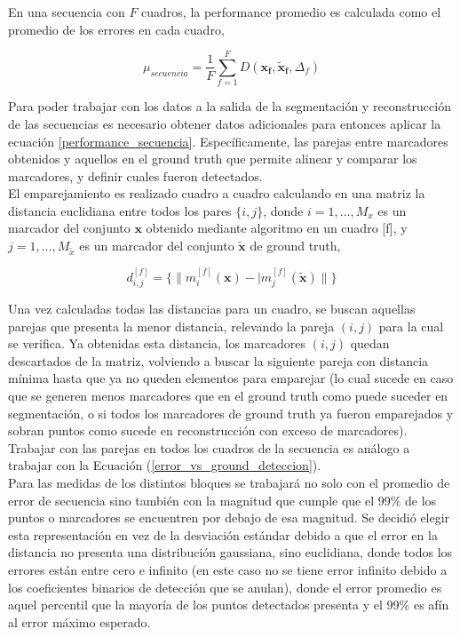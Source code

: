 En una secuencia con $F$ cuadros, la performance promedio es calculada como el promedio de los errores en cada cuadro,

\begin{equation} \label{performance_secuencia}
\mu_{secuencia} = \frac{1}{F}\sum_{f=1}^{F} D(\boldsymbol{x_{f}},\boldsymbol{\tilde{x}_{f}},\Delta_{f})
\end{equation}

Para poder trabajar con los datos a la salida de la segmentación y reconstrucción de las secuencias es necesario obtener datos adicionales para entonces aplicar la ecuación \eqref{performance_secuencia}. Específicamente, las parejas entre marcadores obtenidos y aquellos en el ground truth que permite alinear y comparar los marcadores, y definir cuales fueron detectados.
\\ 

El emparejamiento es realizado cuadro a cuadro calculando en una matriz la distancia euclidiana entre todos los pares $\{i,j\}$, donde $i=1,\ldots,M_{x}$ es un marcador del conjunto $\boldsymbol{x}$ obtenido mediante algoritmo en un cuadro [f], y $j=1,\ldots,M_{\tilde{x}}$ es un marcador del conjunto $\boldsymbol{\tilde{x}}$ de ground truth,

\begin{equation} \label{distancia_algoritmo_ground}
d_{i,j}^{[f]} = \{\|m_{i}^{[f]}(\boldsymbol{x})-|m_{j}^{[f]}(\boldsymbol{\tilde{x}})\|\}
\end{equation}

Una vez calculadas todas las distancias para un cuadro, se buscan aquellas parejas que presenta la menor distancia, relevando la pareja $(i,j)$  para la cual se verifica. Ya obtenidas esta distancia, los marcadores $(i,j)$ quedan descartados de la matriz, volviendo a buscar la siguiente pareja con distancia mínima hasta que ya no queden elementos para emparejar (lo cual sucede en caso que se generen menos marcadores que en el ground truth como puede suceder en segmentación, o si todos los marcadores de ground truth ya fueron emparejados y sobran puntos como sucede en reconstrucción con exceso de marcadores). Trabajar con las parejas en todos los cuadros de la secuencia es análogo a trabajar con la Ecuación (\ref{error_vs_ground_deteccion}).
\\ 

Para las medidas de los distintos bloques se trabajará no solo con el promedio de error de secuencia sino también con la magnitud que cumple que el 99\% de los puntos o marcadores se encuentren por debajo de esa magnitud. Se decidió elegir esta representación en vez de la desviación estándar debido a que el error en la distancia no presenta una distribución gaussiana, sino euclidiana, donde todos los errores están entre cero e infinito (en este caso no se tiene error infinito debido a los coeficientes binarios de detección que se anulan), donde el error promedio es aquel percentil que la mayoría de los puntos detectados presenta y el 99\% es afín al error máximo esperado.


